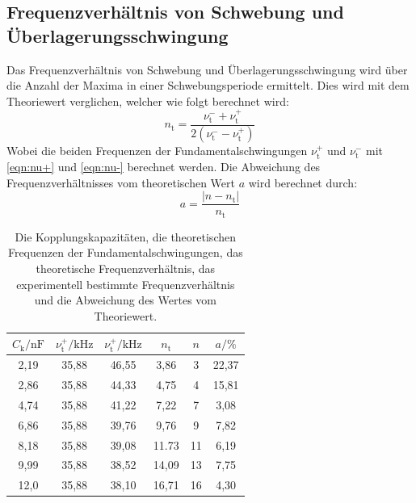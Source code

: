\documentclass[titlepage = firstcover]{scrartcl}
\begin{document}
    \subsection{Frequenzverhältnis von Schwebung und Überlagerungsschwingung}
        Das Frequenzverhältnis von Schwebung und Überlagerungsschwingung wird über die Anzahl der Maxima in einer Schwebungsperiode ermittelt.
        Dies wird mit dem Theoriewert verglichen, welcher wie folgt berechnet wird:
        \begin{equation}
            n_\text{t} = \frac{\nu_\text{t}^- + \nu_\text{t}^+}{2 (\nu_\text{t}^- - \nu_\text{t}^+)}
        \end{equation}
        Wobei die beiden Frequenzen der Fundamentalschwingungen $\nu_\text{t}^+$ und $\nu_\text{t}^-$ mit \eqref{eqn:nu+} und \eqref{eqn:nu-} berechnet werden.
        Die Abweichung des Frequenzverhältnisses vom theoretischen Wert $a$ wird berechnet durch:
        \begin{equation}
            a = \frac{| n - n_\text{t} |}{n_\text{t}}
        \end{equation}
        \begin{table}[h]
            \centering
            \caption{Die Kopplungskapazitäten, die theoretischen Frequenzen der Fundamentalschwingungen, das theoretische Frequenzverhältnis, das experimentell bestimmte Frequenzverhältnis und die Abweichung des Wertes vom Theoriewert.}
            \label{tab:Tabelle1}
            \begin{tabular}{c c c c c c}
                \toprule
                {$C_\text{k} / \text{nF}$} & {$\nu_\text{t}^+ / \text{kHz}$} & {$\nu_\text{t}^+ / \text{kHz}$} & {$n_\text{t}$} & {$n$} & {$a / \%$}\\
                \midrule
                2,19 & 35,88 & 46,55 & 3,86  & 3  & 22,37 \\
                2,86 & 35,88 & 44,33 & 4,75  & 4  & 15,81 \\
                4,74 & 35,88 & 41,22 & 7,22  & 7  & 3,08  \\
                6,86 & 35,88 & 39,76 & 9,76  & 9  & 7,82  \\
                8,18 & 35,88 & 39,08 & 11.73 & 11 & 6,19  \\
                9,99 & 35,88 & 38,52 & 14,09 & 13 & 7,75  \\
                12,0 & 35,88 & 38,10 & 16,71 & 16 & 4,30  \\
                \bottomrule
            \end{tabular}
        \end{table}
        \FloatBarrier
        \noindent
        
\end{document}
